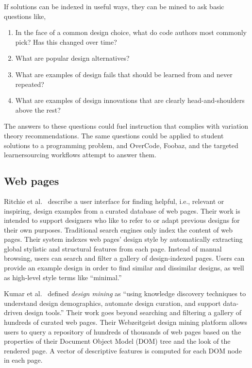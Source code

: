If solutions can be indexed in useful ways, they can be mined to ask basic questions like,
\begin{enumerate}
\item    In the face of a common design choice, what do code authors most commonly pick? Has this changed over time?
\item    What are popular design alternatives?
\item    What are examples of design fails that should be learned from and never repeated?
\item    What are examples of design innovations that are clearly head-and-shoulders above the rest?
\end{enumerate}
The answers to these questions could fuel instruction that complies with variation theory recommendations. The same questions could be applied to student solutions to a programming problem, and OverCode, Foobaz, and the targeted learnersourcing workflows attempt to answer them.


\subsection{Web pages}
Ritchie et al.~\cite{ritchie2011d} describe a user interface for finding helpful, i.e., relevant or inspiring, design examples from a curated database of web pages. Their work is intended to support designers who like to refer to or adapt previous designs for their own purposes. Traditional search engines only index the content of web pages. Their system indexes web pages' design style by automatically extracting global stylistic and structural features from each page. Instead of manual browsing, users can search and filter a gallery of design-indexed pages. Users can provide an example design in order to find similar and dissimilar designs, as well as high-level style terms like ``minimal.''

Kumar et al.~\cite{webzeitgeist} defined {\it design mining} as ``using knowledge discovery techniques to understand design demographics, automate design curation, and support data-driven design tools.'' Their work goes beyond searching and filtering a gallery of hundreds of curated web pages. Their Webzeitgeist design mining platform allows users to query a repository of hundreds of thousands of web pages based on the properties of their Document Object Model (DOM) tree and the look of the rendered page. A vector of descriptive features is computed for each DOM node in each page.

